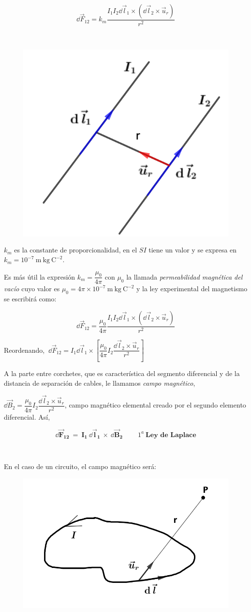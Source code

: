 \begin{multicols}{2}
$$\dd \vec F_{12}=k_m\dfrac{I_1I_2\dd \vec l_1 \times (\dd \vec l_2 \times \vec u_r)}{r^2}$$

$\quad$
\begin{figure}[H]
	\centering
	\includegraphics[width=.35\textwidth]{imagenes/imagenes26/T26IM02.png}
\end{figure}	
\end{multicols}

$k_m$ es la constante de proporcionalidad, en el $SI$ tiene un valor y se expresa en $k_m=10^{-7}\ \mathrm{m\ kg\ C}^{-2}$. 

Es más útil la expresión $k_m=\dfrac{\mu_0}{4\pi}$ con $\mu_0$ la llamada \emph{permeabilidad magnética del vacío} cuyo valor es 
$\mu_0 = 4 \pi \times 10^{-7} \ \mathrm{m\ kg\ C}^{-2}$ y la ley experimental del magnetismo se escribirá como:

\begin{equation}
\dd \vec F_{12}=\dfrac{\mu_0}{4\pi} \dfrac{I_1I_2\dd \vec l_1 \times (\dd \vec l_2 \times \vec u_r)}{r^2}	
\end{equation}

Reordenando, $\ \dd \vec F_{12}=
I_1 \dd \vec l_1 \times \left[ 
\dfrac{\mu_0}{4\pi} I_2 \dfrac{\dd \vec l_2 \times \vec u_r}{r^2}
\right]$	

A la parte entre corchetes, que es característica del segmento diferencial y de la distancia de separación de cables, le llamamos \emph{campo magnético},

$\dd \vec B_2=\dfrac{\mu_0}{4\pi} I_2 \dfrac{\dd \vec l_2 \times \vec u_r}{r^2}$, campo magnético elemental creado por el segundo elemento diferencial. Así,

\begin{equation}
\boldsymbol{ \dd \vec F_{12} \ = \ I_1 \ \dd \vec l_1 \ \times \ \dd \vec B_2 } \qquad \ 1^a \ \textbf{Ley de Laplace}	
\end{equation}

\begin{multicols}{2}
$\quad$

En el caso de un circuito, el campo magnético será:

\begin{figure}[H]
	\centering
	\includegraphics[width=.45\textwidth]{imagenes/imagenes26/T26IM03.png}
\end{figure}	
\end{multicols}

